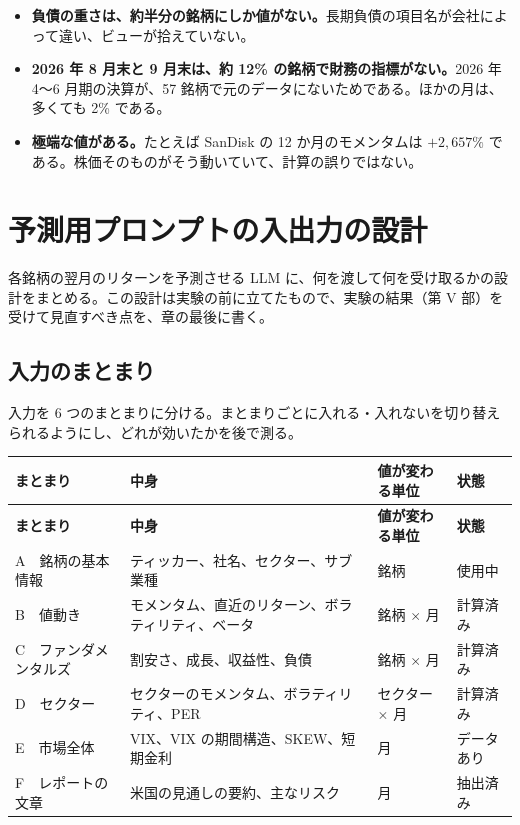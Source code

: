 \documentclass[xelatex,ja=standard,jafont=hiragino-pron,a4paper,10pt]{bxjsreport}
\begin{document}
\begin{itemize}
\item \textbf{負債の重さは、約半分の銘柄にしか値がない。}長期負債の項目名が会社によって違い、ビューが拾えていない。
\item \textbf{2026 年 8 月末と 9 月末は、約 12\% の銘柄で財務の指標がない。}2026 年 4〜6 月期の決算が、57 銘柄で元のデータにないためである。ほかの月は、多くても 2\% である。
\item \textbf{極端な値がある。}たとえば SanDisk の 12 か月のモメンタムは $+2{,}657\%$ である。株価そのものがそう動いていて、計算の誤りではない。
\end{itemize}

\chapter{予測用プロンプトの入出力の設計}\label{ch:io}

各銘柄の翌月のリターンを予測させる LLM に、何を渡して何を受け取るかの設計をまとめる。この設計は実験の前に立てたもので、実験の結果（第 V 部）を受けて見直すべき点を、章の最後に書く。

\section{入力のまとまり}

入力を 6 つのまとまりに分ける。まとまりごとに入れる・入れないを切り替えられるようにし、どれが効いたかを後で測る。

\begin{longtable}{p{3.40cm}p{5.40cm}p{2.60cm}p{3.00cm}}
\toprule
\textbf{まとまり} & \textbf{中身} & \textbf{値が変わる単位} & \textbf{状態} \\
\midrule
\endfirsthead
\toprule
\textbf{まとまり} & \textbf{中身} & \textbf{値が変わる単位} & \textbf{状態} \\
\midrule
\endhead
\bottomrule
\endfoot
A　銘柄の基本情報 & ティッカー、社名、セクター、サブ業種 & 銘柄 & 使用中 \\
B　値動き & モメンタム、直近のリターン、ボラティリティ、ベータ & 銘柄 $\times$ 月 & 計算済み \\
C　ファンダメンタルズ & 割安さ、成長、収益性、負債 & 銘柄 $\times$ 月 & 計算済み \\
D　セクター & セクターのモメンタム、ボラティリティ、PER & セクター $\times$ 月 & 計算済み \\
E　市場全体 & VIX、VIX の期間構造、SKEW、短期金利 & 月 & データあり \\
F　レポートの文章 & 米国の見通しの要約、主なリスク & 月 & 抽出済み \\
\end{longtable}
\end{document}
